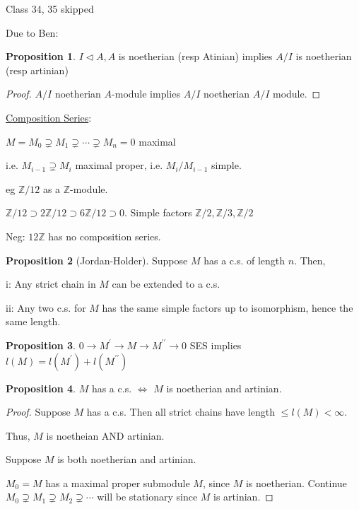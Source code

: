 \documentclass{article}
\theoremstyle{definition}
\newtheorem{proposition}{Proposition}
\begin{document}
Class 34, 35 skipped

Due to Ben:

\begin{proposition}
    \(I \triangleleft A, A\) is noetherian (resp Atinian) implies \(A / I\) is noetherian (resp artinian)
\end{proposition}

\begin{proof}
    \(A/I\) noetherian \(A\)-module implies \(A / I\) noetherian \(A / I\) module.    
\end{proof}

\underline{Composition Series}:

\(M = M_0 \supsetneq M_1 \supsetneq \cdots \supsetneq M_n = 0\) maximal

i.e. \(M_{i-1} \supsetneq M_i\) maximal proper, i.e. \(M_i / M_{i-1}\) simple.

eg \(\mathbb{Z} / 12\)  as a \(\mathbb{Z}\)-module.

\(\mathbb{Z} / 12 \supset 2 \mathbb{Z} / 12 \supset 6 \mathbb{Z} / 12 \supset 0\). Simple factors \(\mathbb{Z} / 2, \mathbb{Z} / 3, \mathbb{Z} /2\)

Neg: \(12\mathbb{Z}\) has no composition series.

\begin{proposition}
    [Jordan-Holder] Suppose \(M\) has a c.s. of length \(n\). Then,

    i: Any strict chain in \(M\) can be extended to a c.s.

    ii: Any two c.s. for \(M\) has the same simple factors up to isomorphism, hence the same length.
\end{proposition}

\begin{proposition}
    \(0 \to M^{\prime} \to M \to M^{\prime\prime} \to 0\) SES implies \(l(M) = l(M^{\prime}) + l(M^{\prime\prime} )\)  
\end{proposition}

\begin{proposition}
    \(M\) has a c.s. \(\iff\) \(M\) is noetherian and artinian. 
\end{proposition}

\begin{proof}
    Suppose \(M\) has a c.s. Then all strict chains have length \(\leq l(M) < \infty\).
    
    Thus, \(M\) is noetheian AND artinian.

    Suppose \(M\) is both noetherian and artinian.

    \(M_0 = M\) has a maximal proper submodule \(M\), since \(M\) is noetherian. Continue \(M_0 \supsetneq M_1 \supsetneq M_2 \supsetneq \cdots\) will be stationary since \(M\) is artinian. 
\end{proof}
\end{document}
